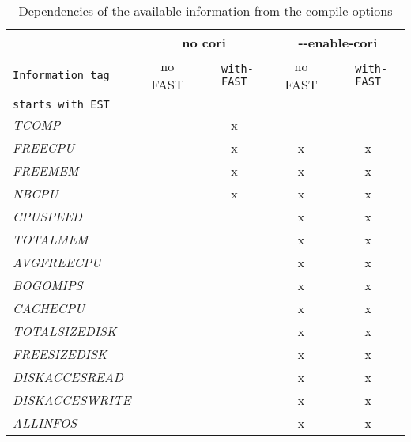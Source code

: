 \begin{table}[h]
 \footnotesize
 \centering
 \begin{tabular}[c]{|l|c|c||c||c|}\hline
   &
  \multicolumn{2}{|c||}{\textbf{no cori}} &
  \multicolumn{2}{|c|}{\textbf{-}\textbf{-enable-cori}}\\[5pt]
  \hline
  \hline

  \texttt{Information tag} 
  & no FAST & \texttt{--with-FAST} &  no FAST & 
  \texttt{--with-FAST} \\

 \texttt{starts with EST\_} & & & & \\[5pt]
  \hline

 \textit{TCOMP        }      &   & x &   &    \\[5pt]
 \hline 
  \textit{FREECPU      }      &   & x & x & x  \\[5pt]
  \hline
  \textit{FREEMEM      }      &   & x & x & x  \\[5pt]
  \hline
  \textit{NBCPU        }      &   & x & x & x  \\[5pt]
  \hline
  \textit{CPUSPEED     }      &   &   & x & x  \\[5pt]
  \hline
  \textit{TOTALMEM     }      &   &   & x & x  \\[5pt]
  \hline
  \textit{AVGFREECPU   }      &   &   & x & x  \\[5pt]
  \hline
  \textit{BOGOMIPS     }      &   &   & x & x  \\[5pt]
  \hline
  \textit{CACHECPU     }      &   &   & x & x  \\[5pt]
  \hline
  \textit{TOTALSIZEDISK}      &   &   & x & x  \\[5pt]
  \hline
  \textit{FREESIZEDISK }      &   &   & x & x  \\[5pt]
  \hline
  \textit{DISKACCESREAD}      &   &   & x & x  \\[5pt]
  \hline
  \textit{DISKACCESWRITE}     &   &   & x & x  \\[5pt]
  \hline
  \textit{ALLINFOS     }      &   &   & x & x  \\[5pt]
  \hline
 \end{tabular}
 \caption{Dependencies of the available information from the
 compile options}
 \label{t:depcompil}
\end{table}

